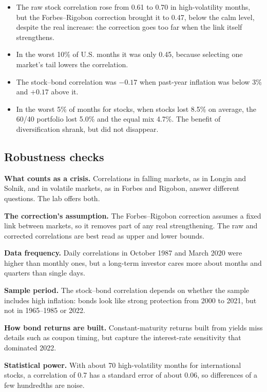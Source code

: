 \begin{itemize}
  \item The raw stock correlation rose from 0.61 to 0.70 in high-volatility months, but the Forbes--Rigobon correction brought it to 0.47, below the calm level, despite the real increase: the correction goes too far when the link itself strengthens.
  \item In the worst 10\% of U.S. months it was only 0.45, because selecting one market's tail lowers the correlation.
  \item The stock--bond correlation was $-0.17$ when past-year inflation was below 3\% and $+0.17$ above it.
  \item In the worst 5\% of months for stocks, when stocks lost 8.5\% on average, the 60/40 portfolio lost 5.0\% and the equal mix 4.7\%. The benefit of diversification shrank, but did not disappear.
\end{itemize}

\subsection{Robustness checks}
\label{sec:13-stress}

\textbf{What counts as a crisis.} Correlations in falling markets, as in Longin and Solnik, and in volatile markets, as in Forbes and Rigobon, answer different questions. The lab offers both.

\textbf{The correction's assumption.} The Forbes--Rigobon correction assumes a fixed link between markets, so it removes part of any real strengthening. The raw and corrected correlations are best read as upper and lower bounds.

\textbf{Data frequency.} Daily correlations in October 1987 and March 2020 were higher than monthly ones, but a long-term investor cares more about months and quarters than single days.

\textbf{Sample period.} The stock--bond correlation depends on whether the sample includes high inflation: bonds look like strong protection from 2000 to 2021, but not in 1965--1985 or 2022.

\textbf{How bond returns are built.} Constant-maturity returns built from yields miss details such as coupon timing, but capture the interest-rate sensitivity that dominated 2022.

\textbf{Statistical power.} With about 70 high-volatility months for international stocks, a correlation of 0.7 has a standard error of about 0.06, so differences of a few hundredths are noise.


